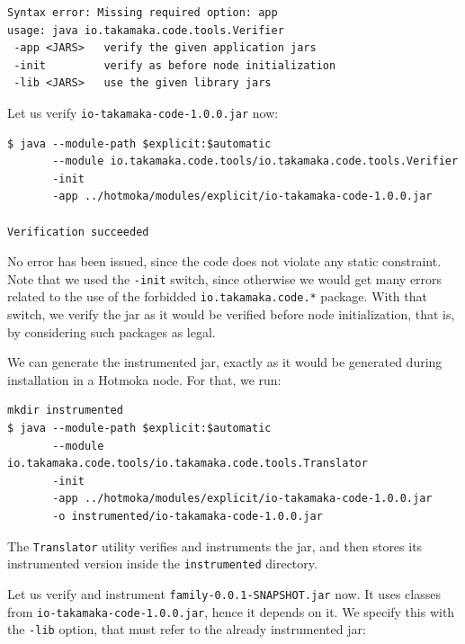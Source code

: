 \documentclass[a4paper,]{book}
\begin{document}
{\begin{myverbatim}
\begin{verbatim}
Syntax error: Missing required option: app
usage: java io.takamaka.code.tools.Verifier
 -app <JARS>   verify the given application jars
 -init         verify as before node initialization
 -lib <JARS>   use the given library jars
\end{verbatim}
\end{myverbatim}

Let us verify \texttt{io-takamaka-code-1.0.0.jar} now:

\begin{myverbatim}
\begin{verbatim}
$ java --module-path $explicit:$automatic
       --module io.takamaka.code.tools/io.takamaka.code.tools.Verifier
       -init
       -app ../hotmoka/modules/explicit/io-takamaka-code-1.0.0.jar

Verification succeeded
\end{verbatim}
\end{myverbatim}

No error has been issued, since the code does not violate any static
constraint. Note that we used the \texttt{-init} switch, since otherwise
we would get many errors related to the use of the forbidded
\texttt{io.takamaka.code.*} package. With that switch, we verify the jar
as it would be verified before node initialization, that is, by
considering such packages as legal.

We can generate the instrumented jar, exactly as it would be generated
during installation in a Hotmoka node. For that, we run:

\begin{myverbatim}
\begin{verbatim}
mkdir instrumented
$ java --module-path $explicit:$automatic
       --module io.takamaka.code.tools/io.takamaka.code.tools.Translator
       -init
       -app ../hotmoka/modules/explicit/io-takamaka-code-1.0.0.jar
       -o instrumented/io-takamaka-code-1.0.0.jar
\end{verbatim}
\end{myverbatim}

The \texttt{Translator} utility verifies and instruments the jar, and
then stores its instrumented version inside the \texttt{instrumented}
directory.

Let us verify and instrument \texttt{family-0.0.1-SNAPSHOT.jar} now. It
uses classes from \texttt{io-takamaka-code-1.0.0.jar}, hence it depends
on it. We specify this with the \texttt{-lib} option, that must refer to
the already instrumented jar:

}
\end{document}
